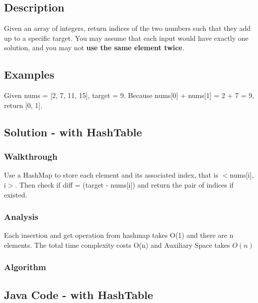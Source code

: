 \documentclass[]{book}
\begin{document}
\hypertarget{description}{%
\subsection{Description}\label{description}}

Given an array of integers, return indices of the two numbers such that they add up to a specific target.
You may assume that each input would have exactly one solution, and you may not \textbf{use the same element twice}.

\hypertarget{examples}{%
\subsection{Examples}\label{examples}}

Given nums = {[}2, 7, 11, 15{]}, target = 9. Because nums{[}0{]} + nums{[}1{]} = 2 + 7 = 9, return {[}0, 1{]}.

\hypertarget{solution---with-hashtable}{%
\subsection{Solution - with HashTable}\label{solution---with-hashtable}}

\hypertarget{walkthrough}{%
\subsubsection{Walkthrough}\label{walkthrough}}

Use a HashMap to store each element and its associated index, that is \(<\)nums{[}i{]}, i\(>\). Then check if diff =
(target - nums{[}i{]}) and return the pair of indices if existed.

\hypertarget{analysis}{%
\subsubsection{Analysis}\label{analysis}}

Each insertion and get operation from hashmap takes O(1) and there are n elements. The total time complexity costs
O(n) and Auxiliary Space takes \(O(n)\)

\hypertarget{algorithm}{%
\subsubsection{Algorithm}\label{algorithm}}

\hypertarget{java-code---with-hashtable}{%
\subsection{Java Code - with HashTable}\label{java-code---with-hashtable}}
\end{document}
